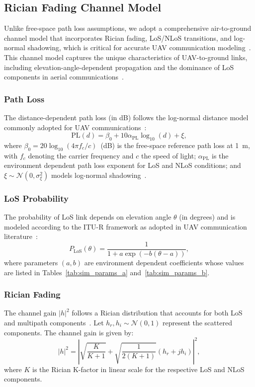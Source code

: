 \documentclass[journal]{IEEEtran}
\begin{document}
\subsection{Rician Fading Channel Model}
Unlike free-space path loss assumptions, we adopt a comprehensive air-to-ground channel model that incorporates Rician fading, LoS/NLoS transitions, and log-normal shadowing, which is critical for accurate UAV communication modeling~\cite{khuwaja2018survey, pandey2025rfeh, pandeyiot2023}. This channel model captures the unique characteristics of UAV-to-ground links, including elevation-angle-dependent propagation and the dominance of LoS components in aerial communications~\cite{pandeydualuav2026}.

\subsubsection{Path Loss}
The distance-dependent path loss (in dB) follows the log-normal distance model commonly adopted for UAV communications~\cite{khuwaja2018survey, pandeyiot2023}:
\begin{equation}
\text{PL}(d) = \beta_0 + 10 \alpha_{\text{PL}} \log_{10}(d) + \xi,
\label{eq:pathloss}
\end{equation}
where $\beta_0 = 20\log_{10}(4\pi f_c / c)$~(dB) is the free-space reference path loss at 1~m, with $f_c$ denoting the carrier frequency and $c$ the speed of light; $\alpha_{\text{PL}}$ is the environment dependent path loss exponent for LoS and NLoS conditions; and $\xi \sim \mathcal{N}(0, \sigma_{\xi}^2)$ models log-normal shadowing~\cite{pandeyiot2023, pandeyrfehiot2025}.

\subsubsection{LoS Probability}
The probability of LoS link depends on elevation angle $\theta$ (in degrees) and is modeled according to the ITU-R framework as adopted in UAV communication literature~\cite{khuwaja2018survey, pandeydualuav2026}:
\begin{equation}
P_{\text{LoS}}(\theta) = \frac{1}{1 + a \exp(-b(\theta - a))},
\label{eq:los}
\end{equation}
where parameters $(a, b)$ are environment dependent coefficients whose values are listed in Tables~\ref{tab:sim_params_a} and~\ref{tab:sim_params_b}.

\subsubsection{Rician Fading}
The channel gain $|h|^2$ follows a Rician distribution that accounts for both LoS and multipath components~\cite{khuwaja2018survey, pandeyiot2023}. Let $h_r, h_i \sim \mathcal{N}(0, 1)$ represent the scattered components. The channel gain is given by:
\begin{equation}
|h|^2 = \left| \sqrt{\frac{K}{K+1}} + \sqrt{\frac{1}{2(K+1)}}(h_r + jh_i) \right|^2,
\label{eq:rician}
\end{equation}
where $K$ is the Rician K-factor in linear scale for the respective LoS and NLoS components.
\end{document}

